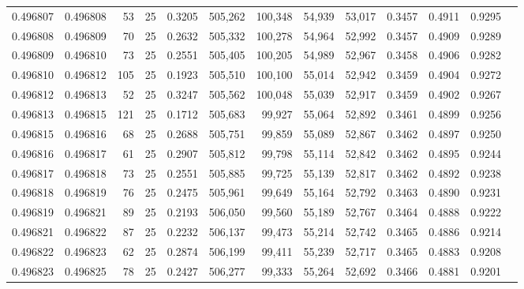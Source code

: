\begin{tabular}{rrrrrrrrrrrrr}
0.496807 & 0.496808 &    53 &  25 &                                     0.3205 & 505,262 & 100,348 &  54,939 &  53,017 & 0.3457 & 0.4911 & 0.9295 \\
0.496808 & 0.496809 &    70 &  25 &                                     0.2632 & 505,332 & 100,278 &  54,964 &  52,992 & 0.3457 & 0.4909 & 0.9289 \\
0.496809 & 0.496810 &    73 &  25 &                                     0.2551 & 505,405 & 100,205 &  54,989 &  52,967 & 0.3458 & 0.4906 & 0.9282 \\
0.496810 & 0.496812 &   105 &  25 &                                     0.1923 & 505,510 & 100,100 &  55,014 &  52,942 & 0.3459 & 0.4904 & 0.9272 \\
0.496812 & 0.496813 &    52 &  25 &                                     0.3247 & 505,562 & 100,048 &  55,039 &  52,917 & 0.3459 & 0.4902 & 0.9267 \\
0.496813 & 0.496815 &   121 &  25 &                                     0.1712 & 505,683 &  99,927 &  55,064 &  52,892 & 0.3461 & 0.4899 & 0.9256 \\
0.496815 & 0.496816 &    68 &  25 &                                     0.2688 & 505,751 &  99,859 &  55,089 &  52,867 & 0.3462 & 0.4897 & 0.9250 \\
0.496816 & 0.496817 &    61 &  25 &                                     0.2907 & 505,812 &  99,798 &  55,114 &  52,842 & 0.3462 & 0.4895 & 0.9244 \\
0.496817 & 0.496818 &    73 &  25 &                                     0.2551 & 505,885 &  99,725 &  55,139 &  52,817 & 0.3462 & 0.4892 & 0.9238 \\
0.496818 & 0.496819 &    76 &  25 &                                     0.2475 & 505,961 &  99,649 &  55,164 &  52,792 & 0.3463 & 0.4890 & 0.9231 \\
0.496819 & 0.496821 &    89 &  25 &                                     0.2193 & 506,050 &  99,560 &  55,189 &  52,767 & 0.3464 & 0.4888 & 0.9222 \\
0.496821 & 0.496822 &    87 &  25 &                                     0.2232 & 506,137 &  99,473 &  55,214 &  52,742 & 0.3465 & 0.4886 & 0.9214 \\
0.496822 & 0.496823 &    62 &  25 &                                     0.2874 & 506,199 &  99,411 &  55,239 &  52,717 & 0.3465 & 0.4883 & 0.9208 \\
0.496823 & 0.496825 &    78 &  25 &                                     0.2427 & 506,277 &  99,333 &  55,264 &  52,692 & 0.3466 & 0.4881 & 0.9201 \\

\end{tabular}
